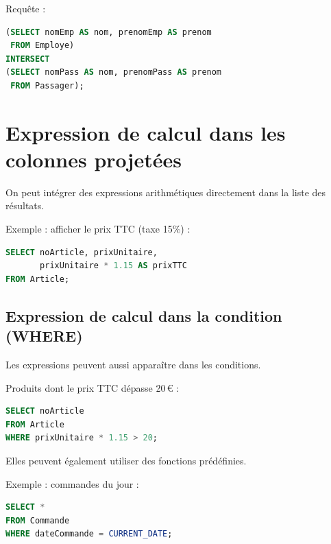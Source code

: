Requête :

\begin{sqlcodebox}
\begin{lstlisting}[language=SQL]
(SELECT nomEmp AS nom, prenomEmp AS prenom
 FROM Employe)
INTERSECT
(SELECT nomPass AS nom, prenomPass AS prenom
 FROM Passager);
\end{lstlisting}
\end{sqlcodebox}


\section{Expression de calcul dans les colonnes projetées}

On peut intégrer des expressions arithmétiques directement dans la liste des résultats.

Exemple : afficher le prix TTC (taxe 15\%) :

\begin{sqlcodebox}
\begin{lstlisting}[language=SQL]
SELECT noArticle, prixUnitaire,
       prixUnitaire * 1.15 AS prixTTC
FROM Article;
\end{lstlisting}
\end{sqlcodebox}


\subsection{Expression de calcul dans la condition (WHERE)}

Les expressions peuvent aussi apparaître dans les conditions.

Produits dont le prix TTC dépasse 20\,€ :

\begin{sqlcodebox}
\begin{lstlisting}[language=SQL]
SELECT noArticle
FROM Article
WHERE prixUnitaire * 1.15 > 20;
\end{lstlisting}
\end{sqlcodebox}

Elles peuvent également utiliser des fonctions prédéfinies.

Exemple : commandes du jour :

\begin{sqlcodebox}
\begin{lstlisting}[language=SQL]
SELECT *
FROM Commande
WHERE dateCommande = CURRENT_DATE;
\end{lstlisting}
\end{sqlcodebox}



